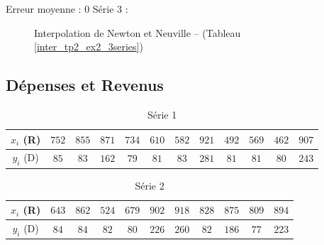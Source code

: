 \documentclass{report}
\begin{document}
	\newline
	Erreur moyenne : $0$
	\newline
	\newline
	\newline
	Série 3 :
	\newline
	\newpage
	\begin{figure}[h]
	  \centering
	  \caption{Interpolation de Newton et Neuville -- (Tableau \ref{inter_tp2_ex2_3series})}
	\end{figure}
      \newpage
      
      \subsection{Dépenses et Revenus}
      \begin{table}[h]
	\centering
	\begin{tabular}{| c | c | c | c | c | c | c | c | c | c | c | c |}
	  \hline 
	  $x_{i}$ (R) & $752$ & $855$ & $871$ & $734$ & $610$ & $582$ & $921$ & $492$ & $569$ & $462$ & $907 $ \\ 
	  \hline 
	  $y_{i}$ (D) & $85$ & $83$ & $162$ & $79$ & $81$ & $83$ & $281$ & $81$ & $81$ & $80$ & $243 $ \\ 
	  \hline 
	\end{tabular}
	\caption{Série 1}
	\label{inter_tp2_ex3_depenses}
      \end{table}
      
      \begin{table}[h]
	\centering
	\begin{tabular}{| c | c | c | c | c | c | c | c | c | c | c |}
	\hline 
	$x_{i}$ (R) & $643$ & $862$ & $524$ & $679$ & $902$ & $918$ & $828$ & $875$ & $809$ & $894$ \\ 
	\hline 
	$y_{i}$ (D) & $84$ & $84$ & $82$ & $80$ & $226$ & $260$ & $82$ & $186$ & $77$ & $223$ \\ 
	\hline 
	\end{tabular}
	\caption{Série 2}
	\label{inter_tp2_ex3_depenses_2}
      \end{table}
      
\end{document}
